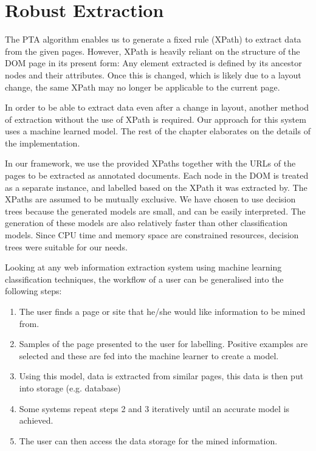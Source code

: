 \section{Robust Extraction}
\label{section:extraction}
The PTA algorithm enables us to generate a fixed rule (XPath) to extract data from the given pages.
However, XPath is heavily reliant on the structure of the DOM page in its present form: Any element
extracted is defined by its ancestor nodes and their attributes. Once this is changed, which is
likely due to a layout change, the same XPath may no longer be applicable to the current page. 

In order to be able to extract data even after a change in layout, another method of extraction
without the use of XPath is required. Our approach for this system uses a machine learned model.
The rest of the chapter elaborates on the details of the implementation.

In our framework, we use the provided XPaths together with the URLs of the pages to be extracted
as annotated documents. Each node in the DOM is treated as a separate instance, and labelled
based on the XPath it was extracted by. The XPaths are assumed to be mutually exclusive. We have
chosen to use decision trees because the generated models are small, and can be easily interpreted.
The generation of these models are also relatively faster than other classification models. Since
CPU time and memory space are constrained resources, decision trees were suitable for our needs.

	
Looking at any web information extraction system using machine learning classification techniques, the workflow of a user can be generalised into the following steps:
\begin{enumerate}
	\item The user finds a page or site that he/she would like information to be mined from.
	\item Samples of the page presented to the user for labelling. Positive examples are selected and these are fed into the machine learner to create a model.
	\item Using this model, data is extracted from similar pages, this data is then put into storage (e.g. database)
	\item Some systems repeat steps 2 and 3 iteratively until an accurate model is achieved. \label{repeatstep}
	\item The user can then access the data storage for the mined information.
\end{enumerate}

